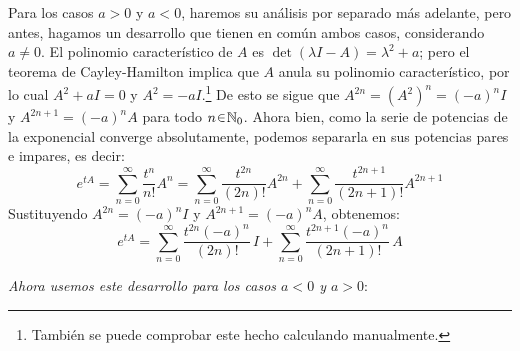 \begin{sol}
\begin{itemize}
\begin{center}
    \end{center}
\end{itemize}


Para los casos $a>0$ y $a<0$, haremos su análisis por separado más adelante, pero antes, hagamos un desarrollo que tienen en común ambos casos, considerando $a \neq 0$.
El polinomio característico de $A$ es $\det(\lambda I - A) = \lambda^2 + a$; pero el teorema de Cayley-Hamilton implica que $A$ anula su polinomio característico, por lo cual $A^2 + aI = 0$ y $A^2 = -a I$.\footnote{También se puede comprobar este hecho calculando manualmente.} De esto se sigue que $A^{2n} = (A^2)^n = (-a)^nI$ y $A^{2n+1} = (-a)^nA$ para todo $n \en \mathbb{N}_0$. Ahora bien, como la serie de potencias de la exponencial converge absolutamente, podemos separarla en sus potencias pares e impares, es decir:
\[
e^{tA} =%
\sum^\infty_{n=0} \frac{t^n}{n!}A^n =%
\sum^\infty_{n=0} \frac{t^{2n}}{(2n)!}A^{2n} + \sum^\infty_{n=0} \frac{t^{2n+1}}{(2n+1)!}A^{2n+1} 
\]
Sustituyendo $A^{2n} = (-a)^nI$ y $A^{2n+1} = (-a)^nA$, obtenemos:
\begin{equation}\label{eq:exp}
e^{tA} =%
\sum^\infty_{n=0} \frac{t^{2n}(-a)^n}{(2n)!}\, I + \sum^\infty_{n=0} \frac{t^{2n+1}(-a)^n}{(2n+1)!}\, A%
\end{equation}

\emph{Ahora usemos este desarrollo para los casos $a < 0$ y $a > 0:$}
\begin{itemize}



\end{itemize}
\end{sol}
